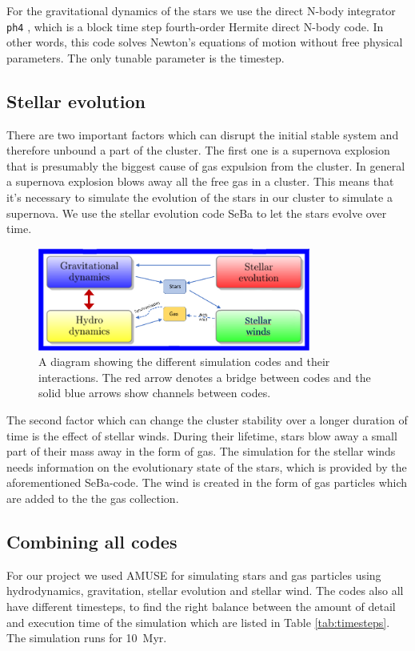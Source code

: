 \documentclass[12pt, twocolumn]{article}
\begin{document}
For the gravitational dynamics of the stars we use the direct N-body integrator \texttt{ph4} \parencite{AMUSE_book}, which is a block time step fourth-order Hermite direct N-body code.
In other words, this code solves Newton's equations of motion without free physical parameters.
The only tunable parameter is the timestep.


\subsection{Stellar evolution}\label{sec:m:star-evo}
There are two important factors which can disrupt the initial stable system and therefore unbound a part of the cluster.
The first one is a supernova explosion that is presumably the biggest cause of gas expulsion from the cluster.
In general a supernova explosion blows away all the free gas in a cluster.
This means that it's necessary to simulate the evolution of the stars in our cluster to simulate a supernova. 
We use the stellar evolution code SeBa \parencite{AMUSE-SeBa1, AMUSE-SeBa2} to let the stars evolve over time.

\begin{figure}[ht]
    \centering
    \includegraphics[width=0.8\textwidth]{figures/interactions.png}
    \caption{A diagram showing the different simulation codes and their interactions. The red arrow denotes a bridge between codes and the solid blue arrows show channels between codes.}
    \label{fig:m:interactions}
\end{figure}

The second factor which can change the cluster stability over a longer duration of time is the effect of stellar winds.
During their lifetime, stars blow away a small part of their mass away in the form of gas.
The simulation for the stellar winds \parencite{stellar_wind.py} needs information on the evolutionary state of the stars, which is provided by the aforementioned SeBa-code.
The wind is created in the form of gas particles which are added to the the gas collection.


\subsection{Combining all codes}\label{sec:m:bridging}
For our project we used AMUSE for simulating stars and gas particles using hydrodynamics, gravitation, stellar evolution and stellar wind.
The codes also all have different timesteps, to find the right balance between the amount of detail and execution time of the simulation which are listed in Table \ref{tab:timesteps}.
The simulation runs for \SI{10}{\mega yr}.
\end{document}
